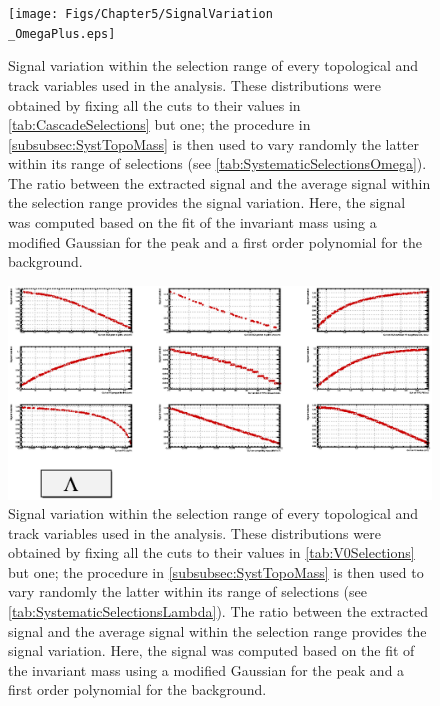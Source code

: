\begin{landscape}
\begin{figure}[h]
	\centering
	\texttt{[image: Figs/Chapter5/SignalVariation\\\_OmegaPlus.eps]}
\caption{Signal variation within the selection range of every topological and track variables used in the \rmAomegaP analysis. These distributions were obtained by fixing all the cuts to their values in \tab\ref{tab:CascadeSelections} but one; the procedure in \Sec\ref{subsubsec:SystTopoMass} is then used to vary randomly the latter within its range of selections (see \tab\ref{tab:SystematicSelectionsOmega}). The ratio between the extracted signal and the average signal within the selection range provides the signal variation. Here, the signal was computed based on the fit of the invariant mass using a modified Gaussian for the peak and a first order polynomial for the background.}
	\label{fig:SignalVariation_TopoSel_OmegaPlus}
\end{figure}

\begin{figure}[h]
	\centering
	\includegraphics[width=1.45\textwidth]{Figs/Chapter5/SignalVariation_Lambda.eps}
\caption{Signal variation within the selection range of every topological and track variables used in the \rmLambda analysis. These distributions were obtained by fixing all the cuts to their values in \tab\ref{tab:V0Selections} but one; the procedure in \Sec\ref{subsubsec:SystTopoMass} is then used to vary randomly the latter within its range of selections (see \tab\ref{tab:SystematicSelectionsLambda}). The ratio between the extracted signal and the average signal within the selection range provides the signal variation. Here, the signal was computed based on the fit of the invariant mass using a modified Gaussian for the peak and a first order polynomial for the background.}
	\label{fig:SignalVariation_TopoSel_Lambda}
\end{figure}


\end{landscape}
